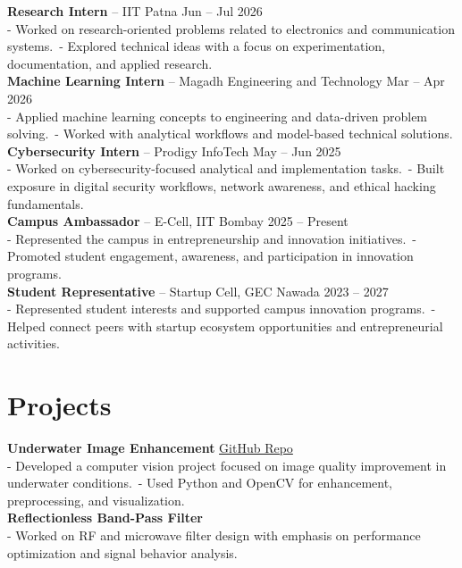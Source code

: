 \documentclass[11pt,a4paper]{article}
\begin{document}
\textbf{Research Intern} -- IIT Patna \hfill Jun -- Jul 2026\\
- Worked on research-oriented problems related to electronics and communication systems.\
- Explored technical ideas with a focus on experimentation, documentation, and applied research.\\

\textbf{Machine Learning Intern} -- Magadh Engineering and Technology \hfill Mar -- Apr 2026\\
- Applied machine learning concepts to engineering and data-driven problem solving.\
- Worked with analytical workflows and model-based technical solutions.\\

\textbf{Cybersecurity Intern} -- Prodigy InfoTech \hfill May -- Jun 2025\\
- Worked on cybersecurity-focused analytical and implementation tasks.\
- Built exposure in digital security workflows, network awareness, and ethical hacking fundamentals.\\

\textbf{Campus Ambassador} -- E-Cell, IIT Bombay \hfill 2025 -- Present\\
- Represented the campus in entrepreneurship and innovation initiatives.\
- Promoted student engagement, awareness, and participation in innovation programs.\\

\textbf{Student Representative} -- Startup Cell, GEC Nawada \hfill 2023 -- 2027\\
- Represented student interests and supported campus innovation programs.\
- Helped connect peers with startup ecosystem opportunities and entrepreneurial activities.

\section*{Projects}
\textbf{Underwater Image Enhancement} \hfill \href{https://github.com/mdzaid-alam/water-enhancement.git}{GitHub Repo}\\
- Developed a computer vision project focused on image quality improvement in underwater conditions.\
- Used Python and OpenCV for enhancement, preprocessing, and visualization.\\

\textbf{Reflectionless Band-Pass Filter}\\
- Worked on RF and microwave filter design with emphasis on performance optimization and signal behavior analysis.\\
\end{document}
